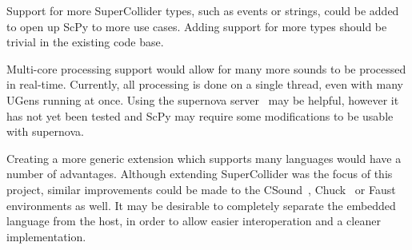 \documentclass{article}
\begin{document}
Support for more SuperCollider types, such as events or strings, could be added to open up ScPy to
more use cases. Adding support for more types should be trivial in the existing code base.

Multi-core processing support would allow for many more sounds to be processed in real-time.
Currently, all processing is done on a single thread, even with many UGens running at once. Using
the supernova server~\cite{blechmann2005supernova} may be helpful, however it has not yet been
tested and ScPy may require some modifications to be usable with supernova.

Creating a more generic extension which supports many languages would have a number of advantages.
Although extending SuperCollider was the focus of this project, similar improvements could be made
to the CSound~\cite{boulanger2000csound,lazzarini2005extensions}, Chuck~\cite{wang2008chuck} or
Faust~\cite{orlarey2009faust} environments as well. It may be desirable to completely separate the
embedded language from the host, in order to allow easier interoperation and a cleaner
implementation.

\newpage\printbibliography{}
\end{document}
